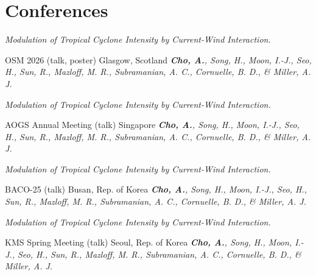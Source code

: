 \documentclass[11pt,usletter,sans]{moderncv}
\begin{document}
\section{Conferences}

        {\parbox[t]{0.8\textwidth}{\textit{Modulation of Tropical Cyclone Intensity by Current-Wind Interaction.}}}
        {OSM 2026 (talk, poster)}   %
        {Glasgow, Scotland}           %
        {}
        {}
        {\emph{\textbf{Cho, A.}, Song, H., Moon, I.-J., Seo, H., Sun, R., Mazloff, M. R., 
Subramanian, A. C., Cornuelle, B. D., \& Miller, A. J.}}
        
\vspace{0.5em}

        {\parbox[t]{0.8\textwidth}{\textit{Modulation of Tropical Cyclone Intensity by Current-Wind Interaction.}}}
        {AOGS Annual Meeting (talk)}   %
        {Singapore}           %
        {}
        {}
        {\emph{\textbf{Cho, A.}, Song, H., Moon, I.-J., Seo, H., Sun, R., Mazloff, M. R., 
Subramanian, A. C., Cornuelle, B. D., \& Miller, A. J.}}
        
\vspace{0.5em}

        {\parbox[t]{0.8\textwidth}{\textit{Modulation of Tropical Cyclone Intensity by Current-Wind Interaction.}}}
        {BACO-25 (talk)}   %
        {Busan, Rep. of Korea}           %
        {}
        {}
        {\emph{\textbf{Cho, A.}, Song, H., Moon, I.-J., Seo, H., Sun, R., Mazloff, M. R., 
Subramanian, A. C., Cornuelle, B. D., \& Miller, A. J.}}
        
\vspace{0.5em}

        {\parbox[t]{0.8\textwidth}{\textit{Modulation of Tropical Cyclone Intensity by Current-Wind Interaction.}}}
        {KMS Spring Meeting (talk)}   %
        {Seoul, Rep. of Korea}           %
        {}
        {}
        {\emph{\textbf{Cho, A.}, Song, H., Moon, I.-J., Seo, H., Sun, R., Mazloff, M. R., 
Subramanian, A. C., Cornuelle, B. D., \& Miller, A. J.}}
        
\vspace{0.5em}
\end{document}
